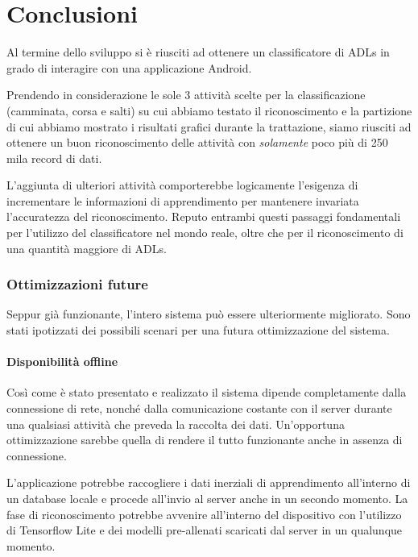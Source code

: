 \chapter{Conclusioni}
Al termine dello sviluppo si è riusciti ad ottenere un classificatore di ADLs in grado di interagire con una applicazione Android.

\vspace{5mm} %

Prendendo in considerazione le sole 3 attività scelte per la classificazione (camminata, corsa e salti) su cui abbiamo testato il riconoscimento 
e la partizione di cui abbiamo mostrato i risultati grafici durante la trattazione, siamo riusciti ad ottenere un buon riconoscimento 
delle attività con \textit{solamente} poco più di 250 mila record di dati.

\vspace{5mm} %

L'aggiunta di ulteriori attività comporterebbe logicamente l'esigenza di incrementare le informazioni di apprendimento per mantenere 
invariata l'accuratezza del riconoscimento. Reputo entrambi questi passaggi fondamentali per l'utilizzo del 
classificatore nel mondo reale, oltre che per il riconoscimento di una quantità maggiore di ADLs.

\subsection*{Ottimizzazioni future}
Seppur già funzionante, l'intero sistema può essere ulteriormente migliorato. 
Sono stati ipotizzati dei possibili scenari per una futura ottimizzazione del sistema.

\subsubsection{Disponibilità offline}
Così come è stato presentato e realizzato il sistema dipende completamente dalla connessione di rete, nonché dalla comunicazione costante con il server 
durante una qualsiasi attività che preveda la raccolta dei dati.
Un'opportuna ottimizzazione sarebbe quella di rendere il tutto funzionante anche in assenza di connessione.

\vspace{5mm} %
L'applicazione potrebbe raccogliere i dati inerziali di apprendimento all'interno di un database locale e procede all'invio al server 
anche in un secondo momento. La fase di riconoscimento potrebbe avvenire all'interno del dispositivo con l'utilizzo di Tensorflow Lite \cite{tensorflow_lite} 
e dei modelli pre-allenati scaricati dal server in un qualunque momento.

